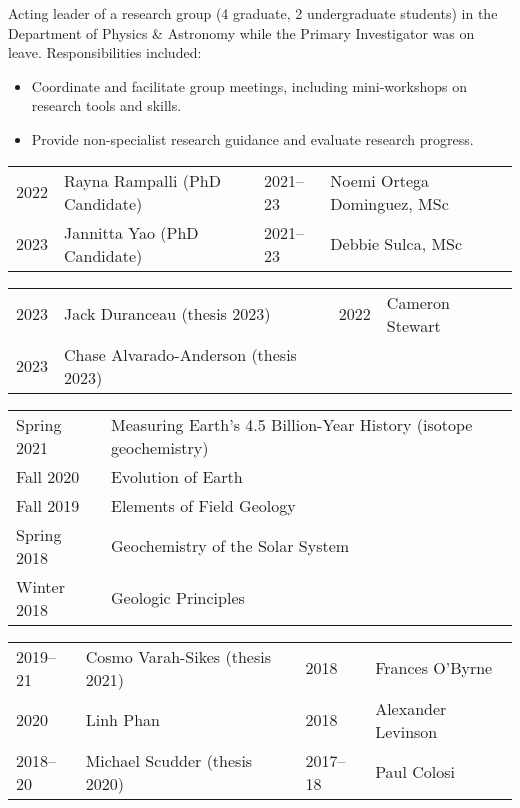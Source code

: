 Acting leader of a research group (4 graduate, 2 undergraduate students) in the Department of Physics \& Astronomy while the Primary Investigator was on leave. Responsibilities included:
\begin{itemize}[itemsep=0pt]
\item Coordinate and facilitate group meetings, including mini-workshops on research tools and skills.
\item Provide non-specialist research guidance and evaluate research progress.
\end{itemize}

\begin{tabular}{ll|ll}
	2022\ongoing & Rayna Rampalli (PhD Candidate) 
	&
	2021--23 & Noemi Ortega Dominguez, MSc
	\\
	2023\ongoing & Jannitta Yao (PhD Candidate)
	&
	2021--23 & Debbie Sulca, MSc
\end{tabular}
\begin{tabular}{ll | ll}
	2023 & Jack Duranceau (thesis 2023) & 2022 & Cameron Stewart\\
	2023 & Chase Alvarado-Anderson (thesis 2023)\\
\end{tabular}

\begin{tabular}{ll}
	Spring 2021 & Measuring Earth’s 4.5 Billion-Year History \normalfont(isotope geochemistry)\\
	Fall 2020 & Evolution of Earth\\
	Fall 2019 & Elements of Field Geology\\
	Spring 2018 & Geochemistry of the Solar System\\
	Winter 2018 & Geologic Principles
\end{tabular}

\begin{tabular}{ll | ll}
	2019--21 & Cosmo Varah-Sikes (thesis 2021) &
	2018 & Frances O'Byrne\\
	2020 & Linh Phan &
	2018 & Alexander Levinson \\
	2018--20 & Michael Scudder (thesis 2020) &
	2017--18 & Paul Colosi
\end{tabular}

